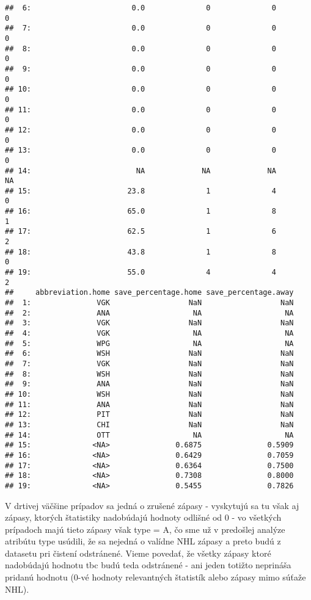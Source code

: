 \documentclass[
]{article}
\begin{document}
\begin{verbatim}
##  6:                       0.0              0              0            0
##  7:                       0.0              0              0            0
##  8:                       0.0              0              0            0
##  9:                       0.0              0              0            0
## 10:                       0.0              0              0            0
## 11:                       0.0              0              0            0
## 12:                       0.0              0              0            0
## 13:                       0.0              0              0            0
## 14:                        NA             NA             NA           NA
## 15:                      23.8              1              4            0
## 16:                      65.0              1              8            1
## 17:                      62.5              1              6            2
## 18:                      43.8              1              8            0
## 19:                      55.0              4              4            2
##     abbreviation.home save_percentage.home save_percentage.away
##  1:               VGK                  NaN                  NaN
##  2:               ANA                   NA                   NA
##  3:               VGK                  NaN                  NaN
##  4:               VGK                   NA                   NA
##  5:               WPG                   NA                   NA
##  6:               WSH                  NaN                  NaN
##  7:               VGK                  NaN                  NaN
##  8:               WSH                  NaN                  NaN
##  9:               ANA                  NaN                  NaN
## 10:               WSH                  NaN                  NaN
## 11:               ANA                  NaN                  NaN
## 12:               PIT                  NaN                  NaN
## 13:               CHI                  NaN                  NaN
## 14:               OTT                   NA                   NA
## 15:              <NA>               0.6875               0.5909
## 16:              <NA>               0.6429               0.7059
## 17:              <NA>               0.6364               0.7500
## 18:              <NA>               0.7308               0.8000
## 19:              <NA>               0.5455               0.7826
\end{verbatim}

V drtivej väčšine prípadov sa jedná o zrušené zápasy - vyskytujú sa tu
však aj zápasy, ktorých štatistiky nadobúdajú hodnoty odlišné od 0 - vo
všetkých prípadoch majú tieto zápasy však type = A, čo sme už v
predošlej analýze atribútu type usúdili, že sa nejedná o valídne NHL
zápasy a preto budú z datasetu pri čistení odstránené. Vieme povedať, že
všetky zápasy ktoré nadobúdajú hodnotu tbc budú teda odstránené - ani
jeden totižto neprináša pridanú hodnotu (0-vé hodnoty relevantných
štatistík alebo zápasy mimo súťaže NHL).
\end{document}
